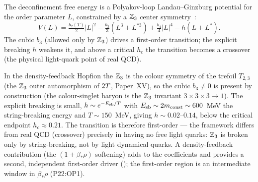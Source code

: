 

The deconfinement free energy is a Polyakov-loop Landau--Ginzburg
potential for the order parameter $L$, constrained by a $\mathbb{Z}_3$
center symmetry~\cite{Pisarski2000}:
\begin{equation}
  V(L)=\tfrac{b_2(T)}{2}|L|^2-\tfrac{b_3}{3}(L^3+L^{*3})+\tfrac{b_4}{4}|L|^4-h(L+L^*).
  \label{P22:eq:polyakov}
\end{equation}
The cubic $b_3$ (allowed only by $\mathbb{Z}_3$) drives a first-order
transition; the explicit breaking $h$ weakens it, and above a critical
$h_c$ the transition becomes a crossover (the physical light-quark
point of real QCD).

\begin{proposition}
\label{P22:prop:fo}
In the density-feedback Hopfion the $\mathbb{Z}_3$ is the colour symmetry of
the trefoil $T_{2,3}$ (the $\mathbb{Z}_3$ outer automorphism of $2T$,
Paper~XV), so the cubic $b_3\neq0$ is present by construction (the
colour-singlet baryon is the $\mathbb{Z}_3$ invariant
$3\times3\times3\to1$). The explicit breaking is small,
$h\sim e^{-E_{\rm sb}/T}$ with $E_{\rm sb}\sim2m_{\rm const}\sim600$~MeV
the string-breaking energy and $T\sim150$~MeV, giving
$h\sim0.02$--$0.14$, below the critical endpoint $h_c\approx0.21$. The
transition is therefore first-order --- the framework differs from
real QCD (crossover) precisely in having no free light quarks:
$\mathbb{Z}_3$ is broken only by string-breaking, not by light dynamical
quarks. A density-feedback contribution (the $(1+\beta_*\rho)$
softening) adds to the coefficients and provides a second, independent
first-order driver (); the
first-order region is an intermediate window in $\beta_*\rho$
(P22:OP1).
\end{proposition}

